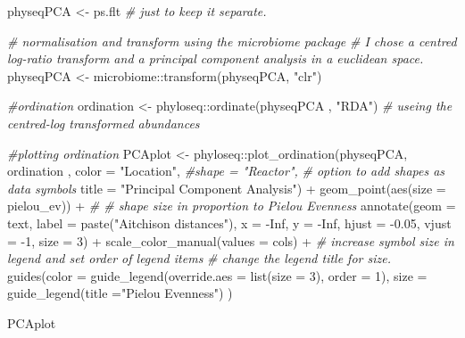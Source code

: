 \documentclass[
]{book}
\newenvironment{Shaded}{\begin{snugshade}}{\end{snugshade}}
\newcommand{\AttributeTok}[1]{\textcolor[rgb]{0.77,0.63,0.00}{#1}}
\newcommand{\CommentTok}[1]{\textcolor[rgb]{0.56,0.35,0.01}{\textit{#1}}}
\newcommand{\ConstantTok}[1]{\textcolor[rgb]{0.00,0.00,0.00}{#1}}
\newcommand{\DecValTok}[1]{\textcolor[rgb]{0.00,0.00,0.81}{#1}}
\newcommand{\FloatTok}[1]{\textcolor[rgb]{0.00,0.00,0.81}{#1}}
\newcommand{\FunctionTok}[1]{\textcolor[rgb]{0.00,0.00,0.00}{#1}}
\newcommand{\NormalTok}[1]{#1}
\newcommand{\OtherTok}[1]{\textcolor[rgb]{0.56,0.35,0.01}{#1}}
\newcommand{\SpecialCharTok}[1]{\textcolor[rgb]{0.00,0.00,0.00}{#1}}
\newcommand{\StringTok}[1]{\textcolor[rgb]{0.31,0.60,0.02}{#1}}
\begin{document}
\begin{Shaded}
\begin{Highlighting}[]
\NormalTok{physeqPCA }\OtherTok{\textless{}{-}}\NormalTok{  ps.flt  }\CommentTok{\# just to keep it separate.}

\CommentTok{\# normalisation and transform using the microbiome package}
\CommentTok{\# I chose a centred log{-}ratio transform and a principal component analysis in a euclidean space.}
\NormalTok{physeqPCA }\OtherTok{\textless{}{-}}\NormalTok{ microbiome}\SpecialCharTok{::}\FunctionTok{transform}\NormalTok{(physeqPCA, }\StringTok{"clr"}\NormalTok{)}

\CommentTok{\#ordination}
\NormalTok{ordination }\OtherTok{\textless{}{-}}\NormalTok{ phyloseq}\SpecialCharTok{::}\FunctionTok{ordinate}\NormalTok{(physeqPCA , }\StringTok{"RDA"}\NormalTok{) }\CommentTok{\# useing the centred{-}log transformed abundances}

\CommentTok{\#plotting ordination}
\NormalTok{PCAplot }\OtherTok{\textless{}{-}}\NormalTok{ phyloseq}\SpecialCharTok{::}\FunctionTok{plot\_ordination}\NormalTok{(physeqPCA, }
\NormalTok{                                      ordination , }
                                      \AttributeTok{color =} \StringTok{"Location"}\NormalTok{, }
                                      \CommentTok{\#shape = "Reactor", }
                                     \CommentTok{\# option to add shapes as data symbols}
                                      \AttributeTok{title =} \StringTok{"Principal Component Analysis"}\NormalTok{) }\SpecialCharTok{+}
     \FunctionTok{geom\_point}\NormalTok{(}\FunctionTok{aes}\NormalTok{(}\AttributeTok{size =}\NormalTok{ pielou\_ev)) }\SpecialCharTok{+}    \CommentTok{\# \# shape size in proportion to Pielou Evenness}
    \FunctionTok{annotate}\NormalTok{(}\AttributeTok{geom =} \StringTok{\textquotesingle{}text\textquotesingle{}}\NormalTok{, }\AttributeTok{label =} \FunctionTok{paste}\NormalTok{(}\StringTok{"Aitchison distances"}\NormalTok{), }
             \AttributeTok{x =} \SpecialCharTok{{-}}\ConstantTok{Inf}\NormalTok{, }\AttributeTok{y =} \SpecialCharTok{{-}}\ConstantTok{Inf}\NormalTok{, }\AttributeTok{hjust =} \SpecialCharTok{{-}}\FloatTok{0.05}\NormalTok{, }\AttributeTok{vjust =} \SpecialCharTok{{-}}\DecValTok{1}\NormalTok{, }\AttributeTok{size =} \DecValTok{3}\NormalTok{)  }\SpecialCharTok{+} 
    \FunctionTok{scale\_color\_manual}\NormalTok{(}\AttributeTok{values =}\NormalTok{ cols) }\SpecialCharTok{+} 
\CommentTok{\# increase symbol size in legend and set order of legend items}
\CommentTok{\# change the legend title for \textasciigrave{}size\textasciigrave{}.}
     \FunctionTok{guides}\NormalTok{(}\AttributeTok{color =} \FunctionTok{guide\_legend}\NormalTok{(}\AttributeTok{override.aes =} \FunctionTok{list}\NormalTok{(}\AttributeTok{size =} \DecValTok{3}\NormalTok{), }\AttributeTok{order =} \DecValTok{1}\NormalTok{), }
            \AttributeTok{size =} \FunctionTok{guide\_legend}\NormalTok{(}\AttributeTok{title =}\StringTok{"Pielou Evenness"}\NormalTok{) ) }

\NormalTok{PCAplot}
\end{Highlighting}
\end{Shaded}
\end{document}
